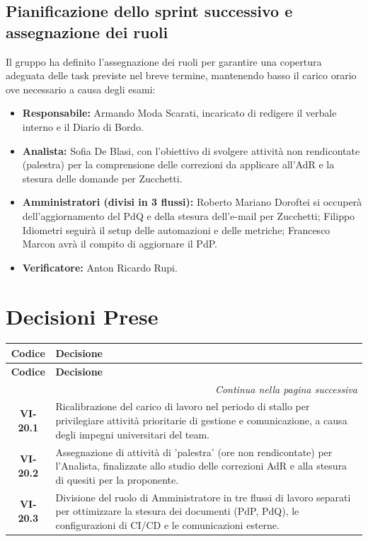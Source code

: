 \subsection{Pianificazione dello sprint successivo e assegnazione dei ruoli}
Il gruppo ha definito l'assegnazione dei ruoli per garantire una copertura adeguata delle task previste nel breve termine, mantenendo basso il carico orario ove necessario a causa degli esami:
\begin{itemize}
    \item \textbf{Responsabile:} Armando Moda Scarati, incaricato di redigere il verbale interno e il Diario di Bordo.
    \item \textbf{Analista:} Sofia De Blasi, con l'obiettivo di svolgere attività non rendicontate (palestra) per la comprensione delle correzioni da applicare all'AdR e la stesura delle domande per Zucchetti.
    \item \textbf{Amministratori (divisi in 3 flussi):} Roberto Mariano Doroftei si occuperà dell'aggiornamento del PdQ e della stesura dell'e-mail per Zucchetti; Filippo Idiometri seguirà il setup delle automazioni e delle metriche; Francesco Marcon avrà il compito di aggiornare il PdP.
    \item \textbf{Verificatore:} Anton Ricardo Rupi.
\end{itemize}

\section{Decisioni Prese}

\renewcommand{\arraystretch}{1.3}
\vspace{-0.3cm}
\noindent
\begin{longtable}{c p{12cm}}
    \toprule
    \textbf{Codice} & \textbf{Decisione} \\
    \midrule
    \endfirsthead

    \toprule
    \textbf{Codice} & \textbf{Decisione} \\
    \midrule
    \endhead

    \midrule
    \multicolumn{2}{r}{\textit{Continua nella pagina successiva}} \\
    \midrule
    \endfoot

    \bottomrule
    \endlastfoot

    \textbf{VI-20.1} & {Ricalibrazione del carico di lavoro nel periodo di stallo per privilegiare attività prioritarie di gestione e comunicazione, a causa degli impegni universitari del team.} \\
	\textbf{VI-20.2} & {Assegnazione di attività di 'palestra' (ore non rendicontate) per l'Analista, finalizzate allo studio delle correzioni AdR e alla stesura di quesiti per la proponente.} \\
	\textbf{VI-20.3} & {Divisione del ruolo di Amministratore in tre flussi di lavoro separati per ottimizzare la stesura dei documenti (PdP, PdQ), le configurazioni di CI/CD e le comunicazioni esterne.}
\end{longtable}


